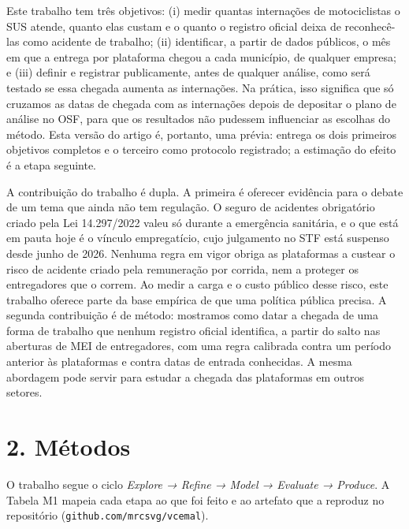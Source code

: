 \documentclass[
  11pt,
]{article}
\begin{document}
Este trabalho tem três objetivos: (i) medir quantas internações de motociclistas o SUS atende, quanto elas custam e o quanto o registro oficial deixa de reconhecê-las como acidente de trabalho; (ii) identificar, a partir de dados públicos, o mês em que a entrega por plataforma chegou a cada município, de qualquer empresa; e (iii) definir e registrar publicamente, antes de qualquer análise, como será testado se essa chegada aumenta as internações. Na prática, isso significa que só cruzamos as datas de chegada com as internações depois de depositar o plano de análise no OSF, para que os resultados não pudessem influenciar as escolhas do método. Esta versão do artigo é, portanto, uma prévia: entrega os dois primeiros objetivos completos e o terceiro como protocolo registrado; a estimação do efeito é a etapa seguinte.

A contribuição do trabalho é dupla. A primeira é oferecer evidência para o debate de um tema que ainda não tem regulação. O seguro de acidentes obrigatório criado pela Lei 14.297/2022 valeu só durante a emergência sanitária, e o que está em pauta hoje é o vínculo empregatício, cujo julgamento no STF está suspenso desde junho de 2026. Nenhuma regra em vigor obriga as plataformas a custear o risco de acidente criado pela remuneração por corrida, nem a proteger os entregadores que o correm. Ao medir a carga e o custo público desse risco, este trabalho oferece parte da base empírica de que uma política pública precisa. A segunda contribuição é de método: mostramos como datar a chegada de uma forma de trabalho que nenhum registro oficial identifica, a partir do salto nas aberturas de MEI de entregadores, com uma regra calibrada contra um período anterior às plataformas e contra datas de entrada conhecidas. A mesma abordagem pode servir para estudar a chegada das plataformas em outros setores.

\hypertarget{muxe9todos}{%
\section{2. Métodos}\label{muxe9todos}}

O trabalho segue o ciclo \emph{Explore → Refine → Model → Evaluate → Produce}. A Tabela M1 mapeia cada etapa ao que foi feito e ao artefato que a reproduz no repositório (\texttt{github.com/mrcsvg/vcemal}).
\end{document}
